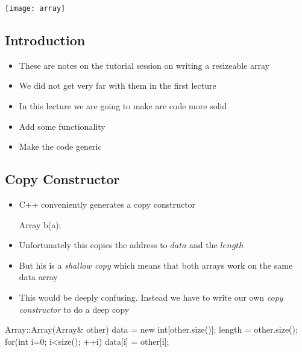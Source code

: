 

\vspace*{-2cm}
\begin{center}
  \texttt{[image: array]}
\end{center}
\vspace*{-1cm}


\begin{slide}
  \section{Introduction}


  \begin{itemize}
  \item These are notes on the tutorial session on writing
    a resizeable array
  \item We did not get very far with them in the first lecture
  \item In this lecture we are going to make are code more solid
  \item Add some functionality
  \item Make the code generic
  \end{itemize}

\end{slide}


\begin{slide}
\section[-1]{Copy Constructor}

\begin{itemize}
\item C++ conveniently generates a copy constructor
  \begin{cpp}
    Array b(a);
  \end{cpp}
\item Unfortunately this copies the address to \jl$data$ and the
  \jl$length$
\item But his is a \textit{shallow copy} which means that both arrays
  work on the same data array
\item This would be deeply confusing.  Instead we have to write our
  own \textit{copy constructor} to do a deep copy
\end{itemize}
\begin{cpp}
Array::Array(Array& other) {
  data = new int[other.size()];
  length = other.size();
  for(int i=0; i<size(); ++i) {
    data[i] = other[i];
  }
}
\end{cpp}
\end{slide}


